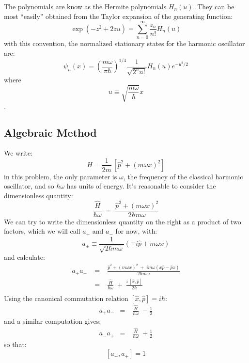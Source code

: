 \documentclass[12pt]{book}
\begin{document}
The polynomials are know as the Hermite polynomials $H_n(u)$.  They can be most ``easily'' obtained from the Taylor expansion of the generating function:
$$\exp(-z^2+2zu) = \sum_{n=0}^{\infty} \frac{z_n}{n!}H_n(u)$$
with this convention, the normalized stationary states for the harmonic oscillator are:
$$\psi_n(x) = \left( \frac{m \omega}{\pi \hbar} \right)^{1/4} \frac{1}{\sqrt{2^n n!}}H_n(u) e^{-u^2/2}$$
where
$$u \equiv \sqrt{\frac{m \omega}{\hbar}} x$$.

 
\subsection{Algebraic Method}

We write:
\begin{equation*}
\hat{H} = \frac{1}{2m}\,\left[ \hat{p}^2 + (m \omega x)^2 \right]
\end{equation*}
in this problem, the only parameter is $\omega$, the frequency of the classical harmonic oscillator, and so $\hbar \omega$ has units of energy. It's reasonable to consider the dimensionless quantity:
\begin{equation*}
\frac{\hat{H}}{\hbar\omega} \; = \; \frac{\hat{p}^2 + (m \omega x)^2 }{2 \hbar m \omega }
\end{equation*}
We can try to write the dimensionless quantity on the right as a product of two factors, which we will call $a_+$ and $a_-$ for now, with:
\begin{equation*}
a_{\pm} \equiv \frac{1}{\sqrt{2\hbar m \omega}}\left(\mp i \hat{p} + m \omega x \right)
\end{equation*}
and calculate:
\begin{eqnarray*}
a_{+}a_{-} \; &=& \; \frac{\hat{p}^2 + (m\omega x)^2 \; + \; i m \omega (x \hat{p} - \hat{p} x)}{2\hbar m \omega}\\[8pt]
&=& \; \frac{\hat{H}}{\hbar\omega} \; + \; \frac{i \, [\hat{x}, \hat{p}]}{2 \hbar}\\
\end{eqnarray*}
Using the canonical commutation relation $[\hat{x}, \hat{p}] = i\hbar$:
\begin{eqnarray*}
a_{+}a_{-} &=& \; \frac{\hat{H}}{\hbar\omega} \; - \frac{1}{2}
\end{eqnarray*}
and a similar computation gives:
\begin{eqnarray*}
a_{-}a_{+} &=& \; \frac{\hat{H}}{\hbar\omega} \; + \frac{1}{2}
\end{eqnarray*}
so that:
\begin{equation}
\label{eqn:ladder-com}
[a_-, a_+] = 1
\end{equation}
\end{document}
